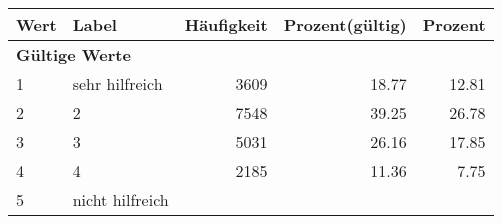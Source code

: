      \begin{longtable}{lXrrr}
     \toprule
     \textbf{Wert} & \textbf{Label} & \textbf{Häufigkeit} & \textbf{Prozent(gültig)} & \textbf{Prozent} \\
     \endhead
     \midrule
     \multicolumn{5}{l}{\textbf{Gültige Werte}}\\

     1 &
     \multicolumn{1}{X}{ sehr hilfreich   } &


       \num{3609} &
       \num[round-mode=places,round-precision=2]{18,77} &
         \num[round-mode=places,round-precision=2]{12,81} \\

     2 &
     \multicolumn{1}{X}{ 2   } &


       \num{7548} &
       \num[round-mode=places,round-precision=2]{39,25} &
         \num[round-mode=places,round-precision=2]{26,78} \\

     3 &
     \multicolumn{1}{X}{ 3   } &


       \num{5031} &
       \num[round-mode=places,round-precision=2]{26,16} &
         \num[round-mode=places,round-precision=2]{17,85} \\

     4 &
     \multicolumn{1}{X}{ 4   } &


       \num{2185} &
       \num[round-mode=places,round-precision=2]{11,36} &
         \num[round-mode=places,round-precision=2]{7,75} \\

     5 &
     \multicolumn{1}{X}{ nicht hilfreich   } &



\end{longtable}
